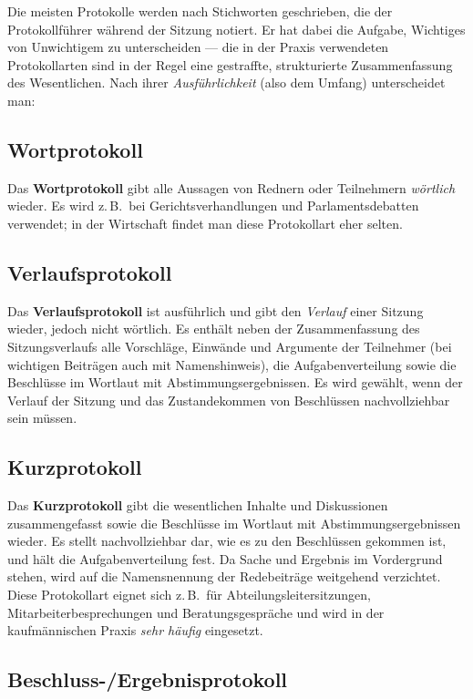 \documentclass[11pt, a4paper]{article}
\begin{document}
Die meisten Protokolle werden nach Stichworten geschrieben, die der Protokollführer
während der Sitzung notiert. Er hat dabei die Aufgabe, Wichtiges von Unwichtigem zu
unterscheiden --- die in der Praxis verwendeten Protokollarten sind in der Regel eine
gestraffte, strukturierte Zusammenfassung des Wesentlichen. Nach ihrer \emph{Ausführlichkeit}
(also dem Umfang) unterscheidet man:

\subsection{Wortprotokoll}

Das \textbf{Wortprotokoll} gibt alle Aussagen von Rednern oder Teilnehmern \emph{wörtlich}
wieder. Es wird z.\,B.\ bei Gerichtsverhandlungen und Parlamentsdebatten verwendet; in
der Wirtschaft findet man diese Protokollart eher selten.

\subsection{Verlaufsprotokoll}

Das \textbf{Verlaufsprotokoll} ist ausführlich und gibt den \emph{Verlauf} einer Sitzung
wieder, jedoch nicht wörtlich. Es enthält neben der Zusammenfassung des Sitzungsverlaufs
alle Vorschläge, Einwände und Argumente der Teilnehmer (bei wichtigen Beiträgen auch mit
Namenshinweis), die Aufgabenverteilung sowie die Beschlüsse im Wortlaut mit
Abstimmungsergebnissen. Es wird gewählt, wenn der Verlauf der Sitzung und das
Zustandekommen von Beschlüssen nachvollziehbar sein müssen.

\subsection{Kurzprotokoll}

Das \textbf{Kurzprotokoll} gibt die wesentlichen Inhalte und Diskussionen zusammengefasst
sowie die Beschlüsse im Wortlaut mit Abstimmungsergebnissen wieder. Es stellt
nachvollziehbar dar, wie es zu den Beschlüssen gekommen ist, und hält die Aufgabenverteilung
fest. Da Sache und Ergebnis im Vordergrund stehen, wird auf die Namensnennung der
Redebeiträge weitgehend verzichtet. Diese Protokollart eignet sich z.\,B.\ für
Abteilungsleitersitzungen, Mitarbeiterbesprechungen und Beratungsgespräche und wird in
der kaufmännischen Praxis \emph{sehr häufig} eingesetzt.

\subsection{Beschluss-/Ergebnisprotokoll}
\end{document}
